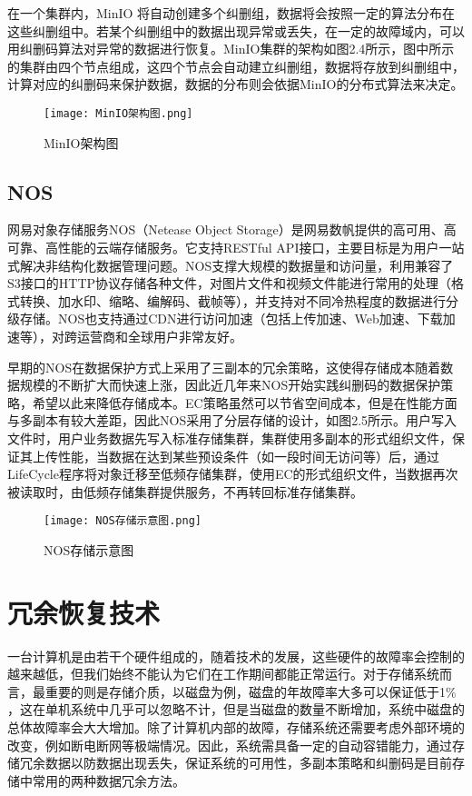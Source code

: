 在一个集群内，MinIO 将自动创建多个纠删组，数据将会按照一定的算法分布在这些纠删组中。若某个纠删组中的数据出现异常或丢失，在一定的故障域内，可以用纠删码算法对异常的数据进行恢复。MinIO集群的架构如图2.4所示，图中所示的集群由四个节点组成，这四个节点会自动建立纠删组，数据将存放到纠删组中，计算对应的纠删码来保护数据，数据的分布则会依据MinIO的分布式算法来决定。

\begin{figure}
    \centering
    \texttt{[image: MinIO架构图.png]}
    \caption{MinIO架构图}
\end{figure}

\subsection{NOS}%
网易对象存储服务NOS（Netease Object Storage）是网易数帆提供的高可用、高可靠、高性能的云端存储服务。它支持RESTful API接口，主要目标是为用户一站式解决非结构化数据管理问题。NOS支撑大规模的数据量和访问量，利用兼容了S3接口的HTTP协议存储各种文件，对图片文件和视频文件能进行常用的处理（格式转换、加水印、缩略、编解码、截帧等），并支持对不同冷热程度的数据进行分级存储。NOS也支持通过CDN进行访问加速（包括上传加速、Web加速、下载加速等），对跨运营商和全球用户非常友好。

早期的NOS在数据保护方式上采用了三副本的冗余策略，这使得存储成本随着数据规模的不断扩大而快速上涨，因此近几年来NOS开始实践纠删码的数据保护策略，希望以此来降低存储成本。EC策略虽然可以节省空间成本，但是在性能方面与多副本有较大差距，因此NOS采用了分层存储的设计，如图2.5所示。用户写入文件时，用户业务数据先写入标准存储集群，集群使用多副本的形式组织文件，保证其上传性能，当数据在达到某些预设条件（如一段时间无访问等）后，通过LifeCycle程序将对象迁移至低频存储集群，使用EC的形式组织文件，当数据再次被读取时，由低频存储集群提供服务，不再转回标准存储集群。

\begin{figure}
    \centering
    \texttt{[image: NOS存储示意图.png]}
    \caption{NOS存储示意图}
\end{figure}

\section{冗余恢复技术}%
一台计算机是由若干个硬件组成的，随着技术的发展，这些硬件的故障率会控制的越来越低，但我们始终不能认为它们在工作期间都能正常运行。对于存储系统而言，最重要的则是存储介质，以磁盘为例，磁盘的年故障率大多可以保证低于1$\%$\cite{34}，这在单机系统中几乎可以忽略不计，但是当磁盘的数量不断增加，系统中磁盘的总体故障率会大大增加。除了计算机内部的故障，存储系统还需要考虑外部环境的改变，例如断电断网等极端情况。因此，系统需具备一定的自动容错能力，通过存储冗余数据以防数据出现丢失，保证系统的可用性，多副本\cite{35}策略和纠删码\cite{36}是目前存储中常用的两种数据冗余方法。

